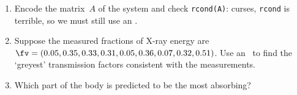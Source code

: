 \begin{exercise}
\begin{enumerate}
\fixwrapenum

\item Encode the matrix~\(A\) of the system and check \verb|rcond(A)|: curses, \verb|rcond| is terrible, so we must still use an \svd.

\item Suppose the measured fractions of X-ray energy are \(\sloppy\fv=(0.05, 0.35, 0.33, 0.31, 0.05, 0.36, 0.07, 0.32, 0.51)\).
\setbox\ajrqrbox\hbox{}%
\marginajrbox%
Use an \svd\ to find the `greyest' transmission factors consistent with the measurements.

\item Which part of the body is predicted to be the most absorbing?

\end{enumerate}
\end{exercise}


